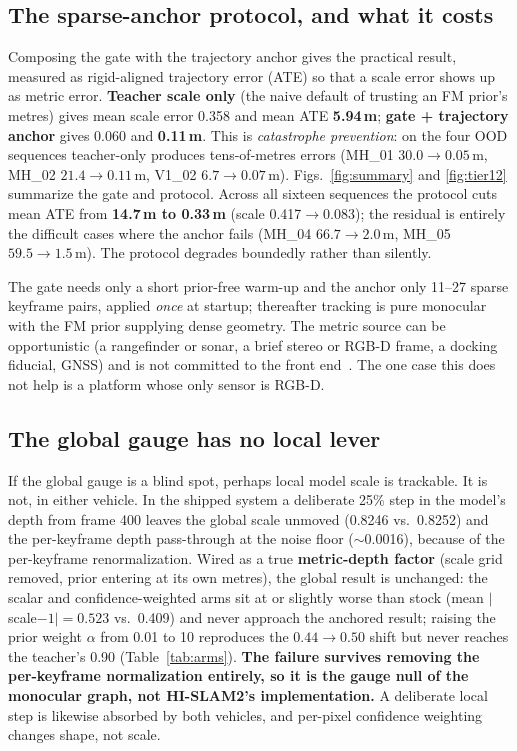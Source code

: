 \subsection{The sparse-anchor protocol, and what it costs}

Composing the gate with the trajectory anchor gives the practical result,
measured as rigid-aligned trajectory error (ATE) so that a scale error shows up
as metric error. \textbf{Teacher scale only} (the naive default of trusting an
FM prior's metres) gives mean scale error 0.358 and mean ATE \textbf{5.94\,m};
\textbf{gate + trajectory anchor} gives 0.060 and \textbf{0.11\,m}. This is
\emph{catastrophe prevention}: on the four OOD sequences teacher-only produces
tens-of-metres errors (MH\_01 $30.0\to0.05$\,m, MH\_02 $21.4\to0.11$\,m, V1\_02
$6.7\to0.07$\,m). Figs.~\ref{fig:summary} and \ref{fig:tier12} summarize the
gate and protocol. Across all sixteen sequences the protocol cuts mean ATE from
\textbf{14.7\,m to 0.33\,m} (scale 0.417$\to$0.083); the residual is entirely the
difficult cases where the anchor fails (MH\_04 $66.7\to2.0$\,m, MH\_05
$59.5\to1.5$\,m). The protocol degrades boundedly rather than silently.

The gate needs only a short prior-free warm-up and the anchor only 11--27 sparse
keyframe pairs, applied \emph{once} at startup; thereafter tracking is pure
monocular with the FM prior supplying dense geometry. The metric source can be
opportunistic (a rangefinder or sonar, a brief stereo or RGB-D frame, a
docking fiducial, GNSS) and is not committed to the front
end~\cite{sinopoli2004,yang2022sonar,murartal2017,olson2011,wu2017vins}. The one
case this does not help is a platform whose only sensor is RGB-D.

\subsection{The global gauge has no local lever}
\label{sec:nolocal}

If the global gauge is a blind spot, perhaps local model scale is trackable. It
is not, in either vehicle. In the shipped system a deliberate 25\% step in the
model's depth from frame 400 leaves the global scale unmoved (0.8246 vs.\ 0.8252)
and the per-keyframe depth pass-through at the noise floor ($\sim$0.0016),
because of the per-keyframe renormalization. Wired as a true \textbf{metric-depth
factor} (scale grid removed, prior entering at its own metres), the global result
is unchanged: the scalar and confidence-weighted arms sit at or slightly worse
than stock (mean $|$scale$-1|=0.523$ vs.\ 0.409) and never approach the anchored
result; raising the prior weight $\alpha$ from 0.01 to 10 reproduces the
$0.44\to0.50$ shift but never reaches the teacher's 0.90 (Table~\ref{tab:arms}).
\textbf{The failure
survives removing the per-keyframe normalization entirely, so it is the gauge
null of the monocular graph, not HI-SLAM2's implementation.} A deliberate local
step is likewise absorbed by both vehicles, and per-pixel confidence weighting
changes shape, not scale.

